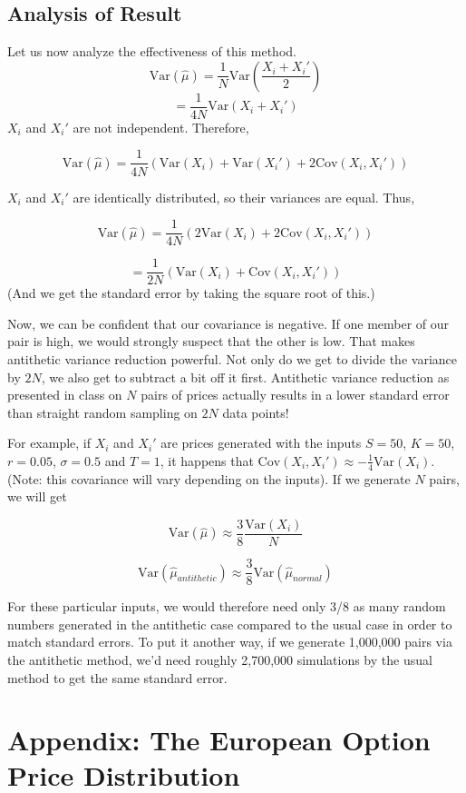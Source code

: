 \documentclass[12pt]{article}
\newcommand{\var}{\ensuremath{\text{Var}}}
\newcommand{\cov}{\ensuremath{\text{Cov}}}
\begin{document}
\subsection{Analysis of Result}

Let us now analyze the effectiveness of this method.
$$ \var(\hat{\mu}) = \frac{1}{N} \var \left( \frac{X_i + X_i'}{2}
\right) $$
$$ = \frac{1}{4N} \var (X_i + X_i') $$
$X_i$ and $X_i'$ are not independent.  Therefore,

$$ \var(\hat{\mu}) = \frac{1}{4N} \left( \var(X_i) + \var (X_i') +
  2\cov (X_i,X_i') \right) $$

$X_i$ and $X_i'$ are identically distributed, so their variances are
equal.  Thus,

$$ \var(\hat{\mu}) = \frac{1}{4N} \left( 2\var(X_i) +
  2\cov (X_i,X_i') \right) $$

$$ = \frac{1}{2N} \left( \var(X_i) + \cov(X_i,X_i')
\right) $$
(And we get the standard error by taking the square root of this.)

Now, we can be confident that our covariance is negative.  If one
member of our pair is high, we would strongly suspect that the other
is low.  That
makes antithetic variance reduction powerful.  Not only do we get to
divide the variance by $2N$, we also get to subtract a bit off it
first.  Antithetic variance reduction as presented in class on $N$
pairs of prices actually results in a lower standard error than
straight random sampling on $2N$ data points!

For example, if $X_i$ and $X_i'$ are prices generated with the inputs
$S = 50$, $K = 50$, $r = 0.05$, $\sigma = 0.5$ and $T = 1$, it happens
that $\cov(X_i,X_i') \approx -\frac{1}{4} \var(X_i)$.  (Note: this
covariance will vary depending on the inputs).  If we generate $N$
pairs, we will get

$$ \var(\hat{\mu}) \approx \frac{3}{8} \frac{\var(X_i)}{N} $$

$$ \var(\hat{\mu}_{antithetic}) \approx \frac{3}{8}
\var(\hat{\mu}_{normal}) $$

For these particular inputs, we would therefore need only 3/8 as many
random numbers generated in the antithetic case compared to the usual
case in order to match standard errors.  To put it another way, if we
generate 1,000,000 pairs via the antithetic method, we'd need roughly
2,700,000 simulations by the usual method to get the same standard
error.

\section{Appendix: The European Option Price Distribution}
\end{document}
